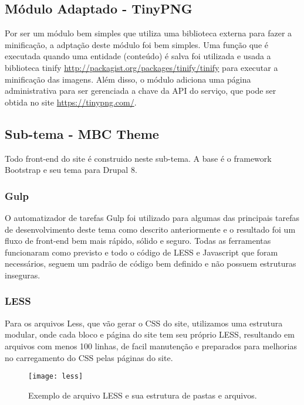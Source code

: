 \subsection{Módulo Adaptado - TinyPNG}
Por ser um módulo bem simples que utiliza uma biblioteca externa para fazer a minificação, a adptação deste módulo foi bem simples. Uma função que é executada quando uma entidade (conteúdo) é salva foi utilizada e usada a biblioteca tinify \url{http://packagist.org/packages/tinify/tinify} para executar a minificação das imagens. Além disso, o módulo adiciona uma página administrativa para ser gerenciada a chave da API do serviço, que pode ser obtida no site \url{https://tinypng.com/}.

\subsection{Sub-tema - MBC Theme}
Todo front-end do site é construido neste sub-tema. A base é o framework Bootstrap e seu tema para Drupal 8. 

\subsubsection{Gulp}
O automatizador de tarefas Gulp foi utilizado para algumas das principais tarefas de desenvolvimento deste tema como descrito anteriormente e o resultado foi um fluxo de front-end bem mais rápido, sólido e seguro. Todas as ferramentas funcionaram como previsto e todo o código de LESS e Javascript que foram necessários, seguem um padrão de código bem definido e não possuem estruturas inseguras.

\subsubsection{LESS}
Para os arquivos Less, que vão gerar o CSS do site, utilizamos uma estrutura modular, onde cada bloco e página do site tem seu próprio LESS, resultando em arquivos com menos 100 linhas, de facil manutenção e preparados para melhorias no carregamento do CSS pelas páginas do site.

\begin{figure}[ht]
  \centering
  \texttt{[image: less]}
  \caption{Exemplo de arquivo LESS e sua estrutura de pastas e arquivos.}
  \label{less}
\end{figure}

